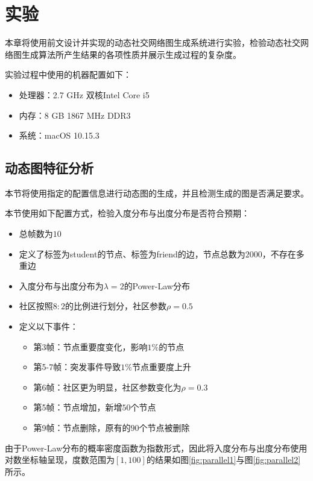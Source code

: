 
\chapter{实验}
\label{cha:chapter05}

本章将使用前文设计并实现的动态社交网络图生成系统进行实验，检验动态社交网络图生成算法所产生结果的各项性质并展示生成过程的复杂度。

实验过程中使用的机器配置如下：

\begin{itemize}
  \item 处理器：2.7 GHz 双核Intel Core i5
  \item 内存：8 GB 1867 MHz DDR3
  \item 系统：macOS 10.15.3
\end{itemize}

\section{动态图特征分析}

本节将使用指定的配置信息进行动态图的生成，并且检测生成的图是否满足要求。

本节使用如下配置方式，检验入度分布与出度分布是否符合预期：

\begin{itemize}
  \item 总帧数为$10$
  \item 定义了标签为student的节点、标签为friend的边，节点总数为$2000$，不存在多重边
  \item 入度分布与出度分布为$\lambda=2$的Power-Law分布
  \item 社区按照$8:2$的比例进行划分，社区参数$\rho=0.5$
  \item 定义以下事件：
  \begin{itemize}
    \item 第3帧：节点重要度变化，影响$1\%$的节点
    \item 第5-7帧：突发事件导致$1\%$节点重要度上升
    \item 第6帧：社区更为明显，社区参数变化为$\rho=0.3$
    \item 第5帧：节点增加，新增$50$个节点
    \item 第9帧：节点删除，原有的$90$个节点被删除
  \end{itemize}
\end{itemize}

由于Power-Law分布的概率密度函数为指数形式，因此将入度分布与出度分布使用对数坐标轴呈现，度数范围为$[1, 100]$的结果如图\ref{fig:parallel1}与图\ref{fig:parallel2}所示。

